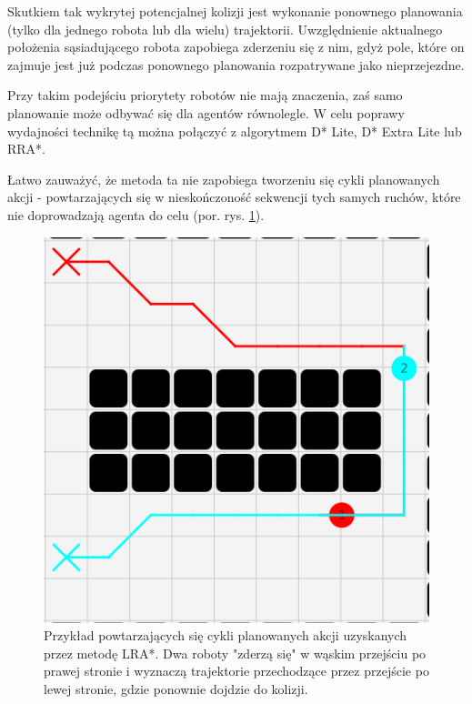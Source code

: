 
Skutkiem tak wykrytej potencjalnej kolizji jest wykonanie ponownego planowania (tylko dla jednego robota lub dla wielu) trajektorii. Uwzględnienie aktualnego położenia sąsiadującego robota zapobiega zderzeniu się z nim, gdyż pole, które on zajmuje jest już podczas ponownego planowania rozpatrywane jako nieprzejezdne.

Przy takim podejściu priorytety robotów nie mają znaczenia, zaś samo planowanie może odbywać się dla agentów równolegle.
W celu poprawy wydajności technikę tą można połączyć z algorytmem D* Lite, D* Extra Lite lub RRA*.

Łatwo zauważyć, że metoda ta nie zapobiega tworzeniu się cykli planowanych akcji - powtarzających się w nieskończoność sekwencji tych samych ruchów, które nie doprowadzają agenta do celu (por. rys. \ref{fig:robopath-lra-cycle}).

\begin{figure}
	\centering
	\includegraphics[width=0.5\columnwidth]{img/robopath/lra-cycle}
	\caption{Przykład powtarzających się cykli planowanych akcji uzyskanych przez metodę LRA*. Dwa roboty "zderzą się" w wąskim przejściu po prawej stronie i wyznaczą trajektorie przechodzące przez przejście po lewej stronie, gdzie ponownie dojdzie do kolizji.}
	\label{fig:robopath-lra-cycle}
\end{figure}
